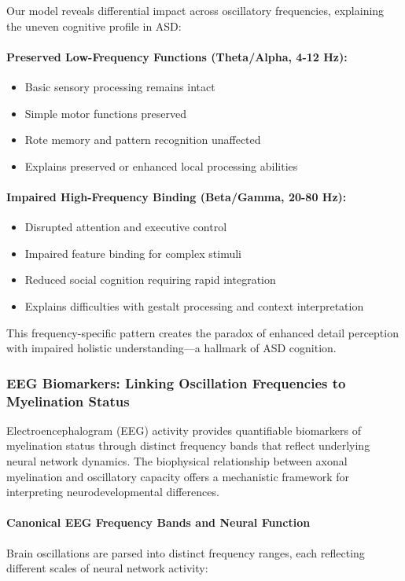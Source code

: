\documentclass[11pt]{article}
\let\oldsubsubsection\subsubsection
\renewcommand{\subsubsection}[1]{\oldsubsubsection{#1}\setlength{\leftskip}{1.5em}}
\begin{document}
Our model reveals differential impact across oscillatory frequencies, explaining the uneven cognitive profile in ASD:

\paragraph{Preserved Low-Frequency Functions (Theta/Alpha, 4-12 Hz):}
\begin{itemize}
\item Basic sensory processing remains intact
\item Simple motor functions preserved
\item Rote memory and pattern recognition unaffected
\item Explains preserved or enhanced local processing abilities
\end{itemize}

\paragraph{Impaired High-Frequency Binding (Beta/Gamma, 20-80 Hz):}
\begin{itemize}
\item Disrupted attention and executive control
\item Impaired feature binding for complex stimuli
\item Reduced social cognition requiring rapid integration
\item Explains difficulties with gestalt processing and context interpretation
\end{itemize}

This frequency-specific pattern creates the paradox of enhanced detail perception with impaired holistic understanding—a hallmark of ASD cognition.

\subsubsection{EEG Biomarkers: Linking Oscillation Frequencies to Myelination Status}

Electroencephalogram (EEG) activity provides quantifiable biomarkers of myelination status through distinct frequency bands that reflect underlying neural network dynamics. The biophysical relationship between axonal myelination and oscillatory capacity offers a mechanistic framework for interpreting neurodevelopmental differences.

\paragraph{Canonical EEG Frequency Bands and Neural Function}
Brain oscillations are parsed into distinct frequency ranges, each reflecting different scales of neural network activity:
\end{document}
